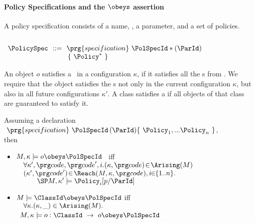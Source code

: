 \paragraph{Policy Specifications and the $\obeys$ assertion}
A policy specification  consists of a name, \PolSpecId, a parameter, and a set of policies.
\begin{definition}
\label{Def:PolSpec}
$ ~ $ 

$
 \begin{array}{lcl}
\PolicySpec\! & \!::=\! & \!\prg{specification}\ \PolSpecId*(\ParId) \\
& & \{\ \Policy^*\ \}
  \end{array}
$
\end{definition}

An object $o$ satisfies a \PolSpecId\ in a configuration $\kappa$, if it satisfies all the \Policy{}s from \PolSpecId. We require that the object satisfies the \Policy{}s not 
only in the current configuration $\kappa$, but also in all future configurations $\kappa'$.
 A class satisfies a \PolSpecId{} if all objects of that class are guaranteed to satisfy it.

\begin{definition}
Assuming a declaration\\ %
$ \ \prg{specification}\ \PolSpecId\,(\ParId)\{\ \Policy_1, ... \Policy_n\ \}$, \\
then

  \begin{itemize}
  \item
$M, \kappa  \models o \obeys \PolSpecId   $ \  iff  \\
\SP  $\ \ \ \forall \kappa',\code, \code', i. (\kappa,\code)\!\in\!\Arising(M)$\\%
\SP  $\ \ \  (\kappa',\code')\!\in\!\Reach(M,\kappa,\code), i\!\!\in\! \!\{1..n\}.$
\SP  $\ \ \ \ \ \ \ \ \ \SP M, \kappa'  \models \Policy_i[ p / {\ParId}]$ 
\item
$M  \models \ClassId \obeys  \PolSpecId  $  iff\\
\SP $\ \ \ \forall \kappa. (\kappa,\_)\in \Arising(M).$\\
\
\SP\SP $ M, \kappa \models o:\ClassId \ \rightarrow\  o \obeys \PolSpecId  $

\end{itemize}
\end{definition}


